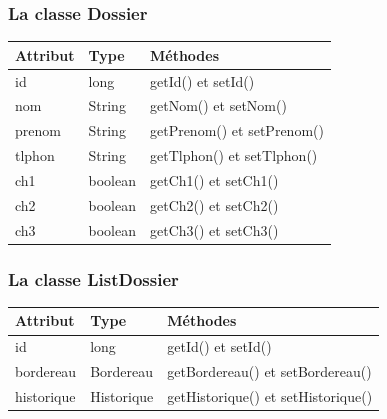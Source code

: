 \subsubsection*{La classe Dossier}
\begin{table}[H]
	\centering\setlength\tabcolsep{1cm}
	
	\begin{tabular}{|l|l|l|}
		\hline
		\textbf{Attribut}  & \textbf{Type} & \multicolumn{1}{l|}{\textbf{Méthodes}} \\ \hline
		
		id & long & getId() et setId()\\ \cline{1-2}
		nom & String & getNom() et setNom()\\ \cline{1-2}
		prenom & String & getPrenom() et setPrenom()\\ \cline{1-2}
		tlphon & String & getTlphon() et setTlphon()\\ \cline{1-2}
		ch1 & boolean  & getCh1() et setCh1()\\ \cline{1-2}   
				ch2 & boolean  & getCh2() et setCh2() \\ \cline{1-2}
						ch3 & boolean  & getCh3() et setCh3() 
		\\ \hline
	\end{tabular}
\end{table}



\subsubsection*{La classe ListDossier}
\begin{table}[H]
	\centering\setlength\tabcolsep{0.8cm}
	
	\begin{tabular}{|l|l|l|}
		\hline
		\textbf{Attribut}  & \textbf{Type} & \multicolumn{1}{l|}{\textbf{Méthodes}} \\ \hline
		
		id & long & getId() et setId()\\ \cline{1-2}
		bordereau & Bordereau & getBordereau() et setBordereau()\\ \cline{1-2}
		historique & Historique & getHistorique() et setHistorique()\\   \hline
	\end{tabular}
\end{table}



